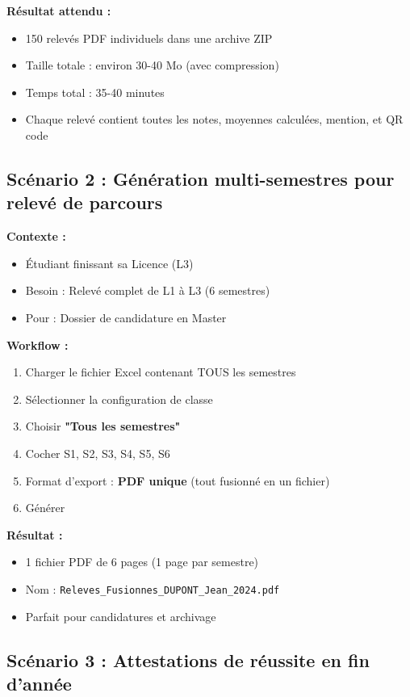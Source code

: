 \textbf{Résultat attendu :}
\begin{itemize}[leftmargin=*]
    \item 150 relevés PDF individuels dans une archive ZIP
    \item Taille totale : environ 30-40 Mo (avec compression)
    \item Temps total : 35-40 minutes
    \item Chaque relevé contient toutes les notes, moyennes calculées, mention, et QR code
\end{itemize}

\subsection{Scénario 2 : Génération multi-semestres pour relevé de parcours}

\textbf{Contexte :}
\begin{itemize}[leftmargin=*]
    \item Étudiant finissant sa Licence (L3)
    \item Besoin : Relevé complet de L1 à L3 (6 semestres)
    \item Pour : Dossier de candidature en Master
\end{itemize}

\textbf{Workflow :}

\begin{enumerate}[leftmargin=*]
    \item Charger le fichier Excel contenant TOUS les semestres
    \item Sélectionner la configuration de classe
    \item Choisir \textbf{"Tous les semestres"}
    \item Cocher S1, S2, S3, S4, S5, S6
    \item Format d'export : \textbf{PDF unique} (tout fusionné en un fichier)
    \item Générer
\end{enumerate}

\textbf{Résultat :}
\begin{itemize}[leftmargin=*]
    \item 1 fichier PDF de 6 pages (1 page par semestre)
    \item Nom : \texttt{Releves\_Fusionnes\_DUPONT\_Jean\_2024.pdf}
    \item Parfait pour candidatures et archivage
\end{itemize}

\subsection{Scénario 3 : Attestations de réussite en fin d'année}

